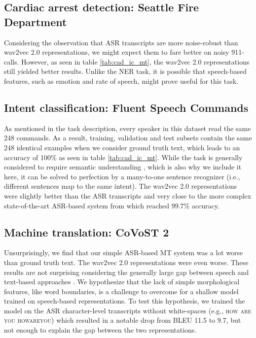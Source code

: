 \documentclass{article}
\begin{document}
\subsection{Cardiac arrest detection: Seattle Fire Department}
\label{sec:ca-res}

Considering the observation that ASR transcripts are more noise-robust than wav2vec 2.0 representations, we might expect them to fare better on noisy 911-calls. However, as seen in table \ref{tab:cad_ic_mt}, the wav2vec 2.0 representations still yielded better results. Unlike the NER task, it is possible that speech-based features, such as emotion and rate of speech, might prove useful for this task.



\subsection{Intent classification: Fluent Speech Commands}
\label{sec:intent-res}

As mentioned in the task description, every speaker in this dataset read the same 248 commands. As a result, training, validation and test subsets contain the same 248 identical examples when we consider ground truth text, which leads to an accuracy of 100\% as seen in table \ref{tab:cad_ic_mt}. While the task is generally considered to require semantic understanding \cite{yang2021superb}, which is also why we include it here, 
it can be solved to perfection by a many-to-one sentence recognizer (i.e., different sentences map to the same intent). 
The wav2vec 2.0 representations were slightly better than the ASR transcripts and very close to the more complex state-of-the-art ASR-based system from \cite{qian2021speech} which reached 99.7\% accuracy.


\subsection{Machine translation: CoVoST 2}
\label{sec:mt-res}

Unsurprisingly, we find that our simple ASR-based MT system was a lot worse than ground truth text. The wav2vec 2.0 representations were even worse. These results are not surprising considering the generally large gap between speech and text-based approaches \cite{wang2020covost}. We hypothesize that the lack of simple morphological features, like word boundaries, is a challenge to overcome for a shallow model trained on speech-based representations. To test this hypothesis, we trained the model on the ASR character-level transcripts without white-spaces (e.g., \textsc{how are you}  \textsc{howareyou}) which resulted in a notable drop from BLEU 11.5 to 9.7, but not enough to explain the gap between the two representations.
\end{document}
